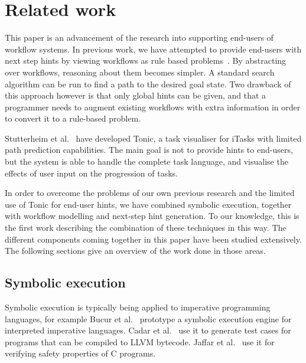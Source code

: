 
\section{Related work}
\label{sec:relatedwork}

This paper is an advancement of the research into supporting end-users of workflow systems.
In previous work, we have attempted to provide end-users with next step hints by viewing workflows as rule based problems~\cite{DBLP:conf/sfp/NausJ16}.
By abstracting over workflows, reasoning about them becomes simpler.
A standard search algorithm can be run to find a path to the desired goal state.
Two drawback of this approach however is that only global hints can be given, and that a programmer needs to augment existing workflows with extra information in order to convert it to a rule-based problem.

Stutterheim et al.~\cite{DBLP:conf/sfp/StutterheimPA14} have developed Tonic, a task visualiser for iTasks with limited path prediction capabilities.
The main goal is not to provide hints to end-users, but the system is able to handle the complete task language, and visualise the effects of user input on the progression of tasks.

In order to overcome the problems of our own previous research and the limited use of Tonic for end-user hints, we have combined symbolic execution, together with workflow modelling and next-step hint generation.
To our knowledge, this is the first work describing the combination of these techniques in this way.
The different components coming together in this paper have been studied extensively.
The following sections give an overview of the work done in those areas.

\subsection{Symbolic execution}


Symbolic execution \cite{King1975,Boyer1975} is typically being applied to imperative programming languages, for example Bucur et al.~\cite{BucurKC2014} prototype a symbolic execution engine for interpreted imperative languages.
Cadar et al.~\cite{CadarDE2008} use it to generate test cases for programs that can be compiled to LLVM bytecode.
Jaffar et al.~\cite{JaffarMNS2012} use it for verifying safety properties of C programs.

